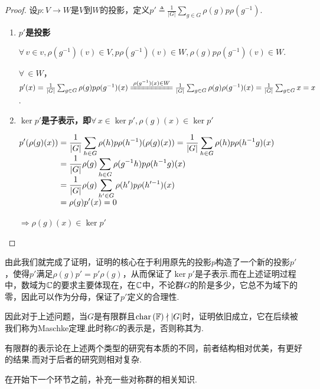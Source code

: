 \begin{proof}
    设$p:V\to W$是$V$到$W$的投影，定义$p'\triangleq \frac{1}{|G|}\sum_{g\in G}\rho(g)p\rho(g^{-1})$.\par
    \begin{enumerate}[label=(\roman*)]
        \item \textbf{\boldmath $p'$是投影}\par
        $\forall\, v\in v,\rho(g^{-1})(v)\in V,p\rho(g^{-1})(v)\in W,\rho(g)p\rho(g^{-1})(v)\in W$.\par
        $\forall\, \in W$，$p'(x)=\frac{1}{|G|}\sum_{g\in G}\rho(g)p\rho(g^{-1})(x)\xlongequal{\rho(g^{-1})(x)\in W}\frac{1}{|G|}\sum_{g\in G}\rho(g)\rho(g^{-1})(x)=\frac{1}{|G|}\sum_{g\in G}x=x$.\par
        \item \textbf{\boldmath $\ker p'$是子表示，即$\forall\, x\in\ker p',\rho(g)(x)\in\ker p'$}\par
        $\setjot[-2]\begin{aligned}[t]
            p'(\rho(g)(x)) &=\frac{1}{|G|}\sum_{h\in G}\rho(h)p\rho(h^{-1})(\rho(g)(x)) =\frac{1}{|G|}\sum_{h\in G}\rho(h)p\rho(h^{-1}g)(x) \\
            &=\frac{1}{|G|}\rho(g)\sum_{h\in G}\rho(g^{-1}h)p\rho(h^{-1}g)(x) \\
            &=\frac{1}{|G|}\rho(g)\sum_{h'\in G}\rho(h')p\rho(h'^{-1})(x) \\
            &=\rho(g)p'(x)=0
        \end{aligned}$ \par
        $\Rightarrow \rho(g)(x)\in\ker p'$\qedhere
    \end{enumerate}
\end{proof}\par
由此我们就完成了证明，证明的核心在于利用原先的投影$p$构造了一个新的投影$p'$，使得$p'$满足$\rho(g)p'=p'\rho(g)$，从而保证了$\ker p'$是子表示.而在上述证明过程中，数域为$\mathbb{C}$的要求主要体现在，在$\mathbb{C}$中，不论群$G$的阶是多少，它总不为域下的零，因此可以作为分母，保证了$p'$定义的合理性.\par
因此对于上述问题，当$G$是有限群且$\mathrm{char}\,(\mathbb{F})\nmid |G|$时，证明依旧成立，它在后续被我们称为Maschke定理.此时称$G$的表示是，否则称其为.\par
有限群的表示论在上述两个类型的研究有本质的不同，前者结构相对优美，有更好的结果.而对于后者的研究则相对复杂.\par
在开始下一个环节之前，补充一些对称群的相关知识.\par

